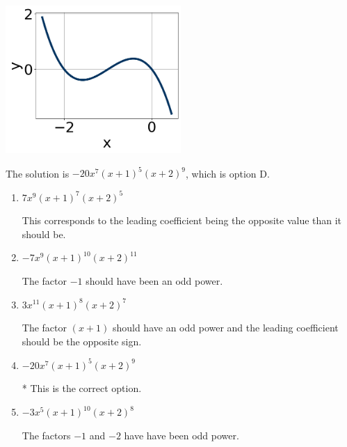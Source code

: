 \documentclass{extbook}[14pt]
\begin{document}
\begin{enumerate}
{\begin{center}
    \includegraphics[width=0.5\textwidth]{../Figures/polyGraphToFunctionCopyB.png}
\end{center}



The solution is \( -20x^{7} (x + 1)^{5} (x + 2)^{9} \), which is option D.\begin{enumerate}[label=\Alph*.]
\item \( 7x^{9} (x + 1)^{7} (x + 2)^{5} \)

This corresponds to the leading coefficient being the opposite value than it should be.
\item \( -7x^{9} (x + 1)^{10} (x + 2)^{11} \)

The factor $-1$ should have been an odd power.
\item \( 3x^{11} (x + 1)^{8} (x + 2)^{7} \)

The factor $(x + 1)$ should have an odd power and the leading coefficient should be the opposite sign.
\item \( -20x^{7} (x + 1)^{5} (x + 2)^{9} \)

* This is the correct option.
\item \( -3x^{5} (x + 1)^{10} (x + 2)^{8} \)

The factors $-1$ and $-2$ have have been odd power.
\end{enumerate}

}
\end{enumerate}
\end{document}
